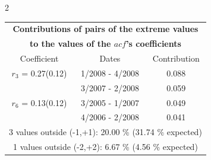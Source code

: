 
\thispagestyle{empty}
\begin{multicols}{2}{ 
\begin{tabular}{ccc}
\multicolumn{3}{c}{\textbf{Contributions of pairs of the extreme values} }  \vspace{-.10in}  \\ 
\multicolumn{3}{c}{ \textbf{to the values of the $acf$'s coefficients}} \\ 
\hline 
\hline                  Coefficient  &  Dates &  Contribution \\ 
\hline 
  $r_{ 3}$ = 0.27(0.12) &       1/2008 -  4/2008 &        0.088   \vspace{-.10in} \\  
&        3/2007 -  2/2008 &        0.059  \vspace{-.02in} \\ \hline 
  $r_{ 6}$ = 0.13(0.12) &       3/2005 -  1/2007 &        0.049   \vspace{-.10in} \\  
&        4/2006 -  2/2008 &        0.041  \vspace{-.02in} \\ \hline 
\multicolumn{3}{c}{               3 values outside (-1,+1): 20.00  \% (31.74  \% expected)}\vspace{-.10in} \\ 
\multicolumn{3}{c}{               1 values outside (-2,+2):  6.67 \%  (4.56 \% expected) } \\
 \end{tabular} \\ 
 } 
\end{multicols} 
